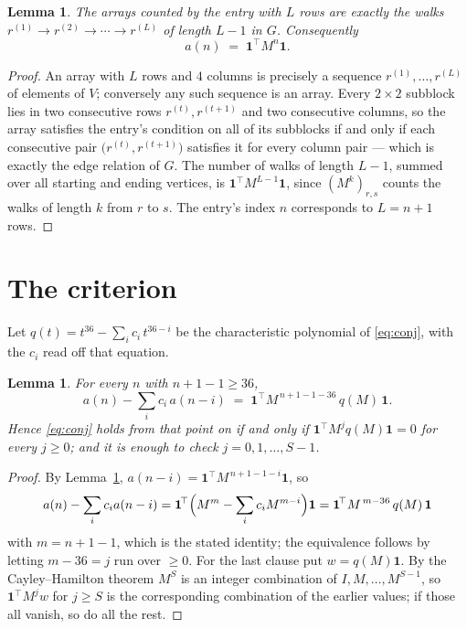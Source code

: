 \documentclass[11pt,a4paper]{article}
\theoremstyle{plain}
\newtheorem{lemma}[theorem]{Lemma}
\theoremstyle{definition}
\begin{document}
\begin{lemma}\label{lem:walk}
The arrays counted by the entry with $L$ rows are exactly the walks
$r^{(1)}\to r^{(2)}\to\cdots\to r^{(L)}$ of length $L-1$ in $G$. Consequently
\[
a(n)\;=\;\mathbf{1}^{\!\top}M^{n}\mathbf{1} .
\]
\end{lemma}

\begin{proof}
An array with $L$ rows and $4$ columns is precisely a sequence
$r^{(1)},\dots,r^{(L)}$ of elements of $V$; conversely any such sequence is an array.
Every $2\times2$ subblock lies in two consecutive rows $r^{(t)},r^{(t+1)}$ and two
consecutive columns, so the array satisfies the entry's condition on all of its subblocks
if and only if each consecutive pair $\bigl(r^{(t)},r^{(t+1)}\bigr)$ satisfies it for
every column pair --- which is exactly the edge relation of $G$. The number of walks of
length $L-1$, summed over all starting and ending vertices, is
$\mathbf{1}^{\!\top}M^{L-1}\mathbf{1}$, since $(M^{k})_{r,s}$ counts the walks of
length $k$ from $r$ to $s$. The entry's index $n$ corresponds to $L=n+1$ rows.
\end{proof}

\section{The criterion}

Let $q(t)=t^{36}-\sum_i c_i\,t^{36-i}$ be the characteristic polynomial of
\eqref{eq:conj}, with the $c_i$ read off that equation.

\begin{lemma}\label{lem:crit}
For every $n$ with $n+1-1\ge36$,
\[
a(n)-\sum_i c_i\,a(n-i)\;=\;\mathbf{1}^{\!\top}M^{\,n+1-1-36}\,q(M)\,\mathbf{1} .
\]
Hence \eqref{eq:conj} holds from that point on if and only if
$\mathbf{1}^{\!\top}M^{j}q(M)\mathbf{1}=0$ for every $j\ge0$; and it is enough to check
$j=0,1,\dots,S-1$.
\end{lemma}

\begin{proof}
By Lemma~\ref{lem:walk}, $a(n-i)=\mathbf{1}^{\!\top}M^{\,n+1-1-i}\mathbf{1}$, so
\[
a(n)-\sum_i c_i a(n-i)
=\mathbf{1}^{\!\top}\Bigl(M^{m}-\sum_i c_i M^{m-i}\Bigr)\mathbf{1}
=\mathbf{1}^{\!\top}M^{\,m-36}\,q(M)\,\mathbf{1}
\]
with $m=n+1-1$, which is the stated identity; the equivalence follows by letting
$m-36=j$ run over $\ge0$. For the last clause put $w=q(M)\mathbf{1}$. By the
Cayley--Hamilton theorem $M^{S}$ is an integer combination of $I,M,\dots,M^{S-1}$, so
$\mathbf{1}^{\!\top}M^{j}w$ for $j\ge S$ is the corresponding combination of the earlier
values; if those all vanish, so do all the rest.
\end{proof}
\end{document}
